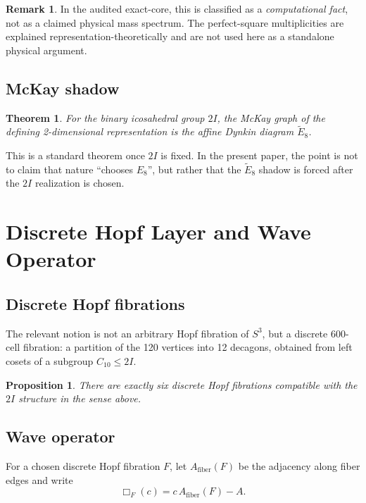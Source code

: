 \documentclass[12pt,a4paper]{article}
\newtheorem{theorem}{Theorem}
\newtheorem{proposition}{Proposition}
\theoremstyle{definition}
\newtheorem{remark}{Remark}
\begin{document}
\begin{remark}
In the audited exact-core, this is classified as a \emph{computational fact},
not as a claimed physical mass spectrum. The perfect-square multiplicities are
explained representation-theoretically and are not used here as a standalone
physical argument.
\end{remark}

\subsection{McKay shadow}

\begin{theorem}
For the binary icosahedral group \(2I\), the McKay graph of the defining
2-dimensional representation is the affine Dynkin diagram \(\widetilde E_8\).
\end{theorem}

This is a standard theorem once \(2I\) is fixed. In the present paper, the
point is not to claim that nature ``chooses \(E_8\)'', but rather that the
\(\widetilde E_8\) shadow is forced after the \(2I\) realization is chosen.

\section{Discrete Hopf Layer and Wave Operator}

\subsection{Discrete Hopf fibrations}

The relevant notion is not an arbitrary Hopf fibration of \(S^3\), but a
discrete 600-cell fibration: a partition of the 120 vertices into 12 decagons,
obtained from left cosets of a subgroup \(C_{10} \leq 2I\).

\begin{proposition}
There are exactly six discrete Hopf fibrations compatible with the \(2I\)
structure in the sense above.
\end{proposition}

\subsection{Wave operator}

For a chosen discrete Hopf fibration \(F\), let \(A_{\mathrm{fiber}}(F)\) be
the adjacency along fiber edges and write
\[
\Box_F(c)=c\,A_{\mathrm{fiber}}(F)-A.
\]
\end{document}
